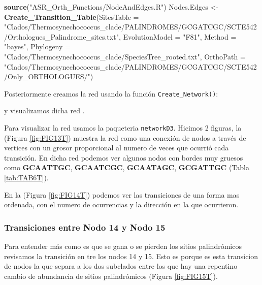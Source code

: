 \documentclass[
]{book}
\newenvironment{Shaded}{\begin{snugshade}}{\end{snugshade}}
\newcommand{\AttributeTok}[1]{\textcolor[rgb]{0.13,0.29,0.53}{#1}}
\newcommand{\FunctionTok}[1]{\textcolor[rgb]{0.13,0.29,0.53}{\textbf{#1}}}
\newcommand{\NormalTok}[1]{#1}
\newcommand{\OtherTok}[1]{\textcolor[rgb]{0.56,0.35,0.01}{#1}}
\newcommand{\StringTok}[1]{\textcolor[rgb]{0.31,0.60,0.02}{#1}}
\begin{document}
\begin{Shaded}
\begin{Highlighting}[]
\FunctionTok{source}\NormalTok{(}\StringTok{"ASR\_Orth\_Functions/NodeAndEdges.R"}\NormalTok{)}
\NormalTok{Nodes.Edges }\OtherTok{\textless{}{-}} \FunctionTok{Create\_Transition\_Table}\NormalTok{(}\AttributeTok{SitesTable =} \StringTok{"Clados/Thermosynechococcus\_clade/PALINDROMES/GCGATCGC/SCTE542/Orthologues\_Palindrome\_sites.txt"}\NormalTok{,}
                                \AttributeTok{EvolutionModel =} \StringTok{"F81"}\NormalTok{,}
                                \AttributeTok{Method =} \StringTok{"bayes"}\NormalTok{,}
                                \AttributeTok{Phylogeny =} \StringTok{"Clados/Thermosynechococcus\_clade/SpeciesTree\_rooted.txt"}\NormalTok{,}
                                \AttributeTok{OrthoPath =} \StringTok{"Clados/Thermosynechococcus\_clade/PALINDROMES/GCGATCGC/SCTE542/Only\_ORTHOLOGUES/"}\NormalTok{)}
\end{Highlighting}
\end{Shaded}

Posteriormente creamos la red usando la función \texttt{Create\_Network()}:

y visualizamos dicha red .

Para visualizar la red usamos la paqueteria \texttt{networkD3}. Hicimos 2 figuras, la (Figura \ref{fig:FIG13T}) muestra la red como una conexión de nodos a través de vertices con un grosor proporcional al numero de veces que ocurrió cada transición. En dicha red podemos ver algunos nodos con bordes muy gruesos como \textbf{GCAATTGC}, \textbf{GCAATCGC}, \textbf{GCAATAGC}, \textbf{GCGATTGC} (Tabla \ref{tab:TAB6T}).

En la (Figura \ref{fig:FIG14T}) podemos ver las transiciones de una forma mas ordenada, con el numero de ocurrencias y la dirección en la que ocurrieron.

\hypertarget{transiciones-entre-nodo-14-y-nodo-15}{%
\subsubsection{Transiciones entre Nodo 14 y Nodo 15}\label{transiciones-entre-nodo-14-y-nodo-15}}

Para entender más como es que se gana o se pierden los sitios palindrómicos revisamos la transición en tre los nodos 14 y 15. Esto es porque es esta transicion de nodos la que separa a los dos subclados entre los que hay una repentino cambio de abundancia de sitios palindrómicos (Figura \ref{fig:FIG15T}).
\end{document}
